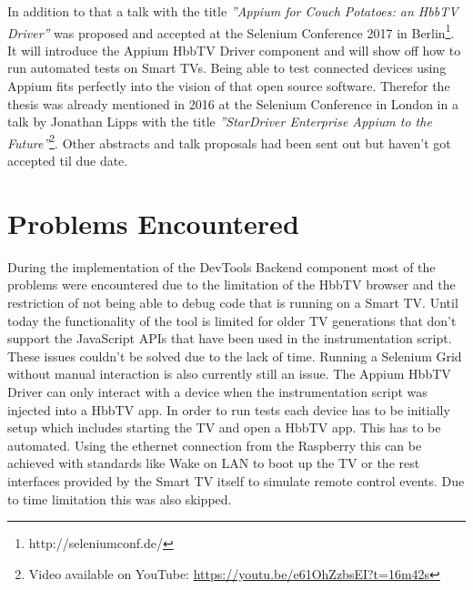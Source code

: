 In addition to that a talk with the title \textit{''Appium for Couch Potatoes: an HbbTV Driver''} was proposed and
accepted at the Selenium Conference 2017 in Berlin\footnote{http://seleniumconf.de/}. It will introduce the Appium
HbbTV Driver component and will show off how to run automated tests on Smart TVs. Being able to test connected
devices using Appium fits perfectly into the vision of that open source software. Therefor the thesis was already
mentioned in 2016 at the Selenium Conference in London in a talk by Jonathan Lipps with the title \textit{''StarDriver
Enterprise Appium to the Future''}\footnote{Video available on YouTube: \url{https://youtu.be/e61OhZzbsEI?t=16m42s}}.
Other abstracts and talk proposals had been sent out but haven't got accepted til due date.

\section{Problems Encountered\label{sec:problems}}


During the implementation of the DevTools Backend component most of the problems were encountered due to the limitation
of the HbbTV browser and the restriction of not being able to debug code that is running on a Smart TV. Until today
the functionality of the tool is limited for older TV generations that don't support the JavaScript APIs that have
been used in the instrumentation script. These issues couldn't be solved due to the lack of time. Running a Selenium
Grid without manual interaction is also currently still an issue. The Appium HbbTV Driver can only interact with a
device when the instrumentation script was injected into a HbbTV app. In order to run tests each device has to be
initially setup which includes starting the TV and open a HbbTV app. This has to be automated. Using the ethernet
connection from the Raspberry this can be achieved with standards like Wake on LAN to boot up the TV or the rest
interfaces provided by the Smart TV itself to simulate remote control events. Due to time limitation this was also
skipped.

